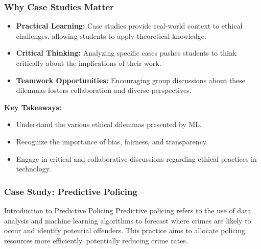 \documentclass[aspectratio=169]{beamer}
\begin{document}
\begin{frame}[fragile]
    \frametitle{Why Case Studies Matter}
    \begin{itemize}
        \item \textbf{Practical Learning:} Case studies provide real-world context to ethical challenges, allowing students to apply theoretical knowledge.
        \item \textbf{Critical Thinking:} Analyzing specific cases pushes students to think critically about the implications of their work.
        \item \textbf{Teamwork Opportunities:} Encouraging group discussions about these dilemmas fosters collaboration and diverse perspectives.
    \end{itemize}
    
    \textbf{Key Takeaways:}
    \begin{itemize}
        \item Understand the various ethical dilemmas presented by ML.
        \item Recognize the importance of bias, fairness, and transparency.
        \item Engage in critical and collaborative discussions regarding ethical practices in technology.
    \end{itemize}
\end{frame}

\begin{frame}[fragile]
    \frametitle{Case Study: Predictive Policing}
    \begin{block}{Introduction to Predictive Policing}
        Predictive policing refers to the use of data analysis and machine learning algorithms to forecast where crimes are likely to occur and identify potential offenders. This practice aims to allocate policing resources more efficiently, potentially reducing crime rates.
    \end{block}
\end{frame}
\end{document}
